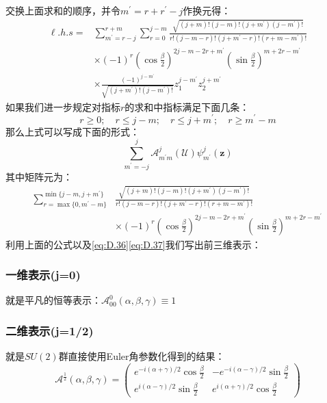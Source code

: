 交换上面求和的顺序，并令$m^\prime=r+r^\prime-j$作换元得：
\begin{equation}
	\begin{aligned}
		\ell.h.s=&\sum_{m^\prime=r-j}^{r+m}\sum_{r=0}^{j-m}\frac{\sqrt{(j+m)!(j-m)!(j+m^\prime)(j-m^\prime)!}}{r!(j-m-r)!(j+m^\prime-r)!(r+m-m^\prime)!}\\
		&\times (-1)^r\left(\cos\frac{\beta}{2}\right)^{2j-m-2r+m^\prime}\left(\sin\frac{\beta}{2}\right)^{m+2r-m^\prime}\\
			&\times \frac{(-1)^{j-m^\prime}}{\sqrt{(j+m^\prime)!(j-m^\prime)!}}z_1^{j-m^\prime}z_2^{j+m^\prime} 
	\end{aligned}
\end{equation}
如果我们进一步规定对指标$r$的求和中指标满足下面几条：
\[r\geq 0;\quad r\leq j-m;\quad r\leq j+m^\prime;\quad r\geq m^\prime-m\]
那么上式可以写成下面的形式：
\[\sum_{m^\prime=-j}^j\mathcal{A}^j_{m^\prime m}(\mathcal{U})\psi_{m^\prime}^j(\mathbf{z})\]
其中矩阵元为：
\begin{align*}
	\sum_{r=\max \{0,m^\prime-m\}}^{\min\{j-m,j+m^\prime\}}&\frac{\sqrt{(j+m)!(j-m)!(j+m^\prime)(j-m^\prime)!}}{r!(j-m-r)!(j+m^\prime-r)!(r+m-m^\prime)!}
 \\
 &\times(-1)^r\left(\cos\frac{\beta}{2}\right)^{2j-m-2r+m^\prime}\left(\sin\frac{\beta}{2}\right)^{m+2r-m^\prime}
\end{align*}
利用上面的公式以及\ref{eq:D.36}\ref{eq:D.37}我们写出前三维表示：
\subsubsection*{一维表示(j=0)}
就是平凡的恒等表示：$\mathcal{A}^0_{00}(\alpha,\beta,\gamma)\equiv 1$
\subsubsection*{二维表示(j=1/2)}
就是$SU(2)$群直接使用Euler角参数化得到的结果：
\begin{equation}
	\mathcal{A}^{\frac{1}{2}}(\alpha,\beta,\gamma)=\left( {\begin{array}{*{20}{c}}
			{{e^{ - i\left( {\alpha  + \gamma } \right)/2}}\cos \frac{\beta }{2}}&{-{e^{-i\left( {\alpha  - \gamma } \right)/2}}\sin \frac{\beta }{2}} \\ 
			{{e^{i\left( {\alpha  - \gamma} \right)/2}}\sin \frac{\beta }{2}}&{{e^{i\left( {\alpha  + \gamma } \right)/2}}\cos \frac{\beta }{2}} 
	\end{array}} \right)
\end{equation}
